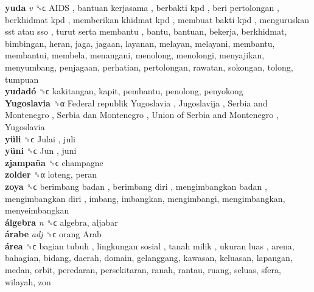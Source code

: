 \textbf{yuda} \emph{v}  ␝ϲ   AIDS ,  bantuan kerjasama ,  berbakti kpd ,  beri pertolongan ,  berkhidmat kpd ,  memberikan khidmat kpd ,  membuat bakti kpd ,  menguruskan sst atau sso ,  turut serta membantu , bantu, bantuan, bekerja, berkhidmat, bimbingan, heran, jaga, jagaan, layanan, melayan, melayani, membantu, membantui, membela, menangani, menolong, menolongi, menyajikan, menyumbang, penjagaan, perhatian, pertolongan, rawatan, sokongan, tolong, tumpuan  \\
\textbf{yudadó} ␝ϲ  kakitangan, kapit, pembantu, penolong, penyokong  \\
\textbf{Yugoslavia} ␝α   Federal republik Yugoslavia ,  Jugoslavija ,  Serbia and Montenegro ,  Serbia dan Montenegro ,  Union of Serbia and Montenegro ,  Yugoslavia   \\
\textbf{yüli} ␝ϲ   Julai , juli  \\
\textbf{yüni} ␝ϲ   Jun , juni  \\
\textbf{zjampaña} ␝ϲ  champagne  \\
\textbf{zolder} ␝α  loteng, peran  \\
\textbf{zoya} ␝ϲ   berimbang badan ,  berimbang diri ,  mengimbangkan badan ,  mengimbangkan diri , imbang, imbangkan, mengimbangi, mengimbangkan, menyeimbangkan  \\
\textbf{álgebra} \emph{n}  ␝ϲ  algebra, aljabar  \\
\textbf{árabe} \emph{adj}  ␝ϲ   orang Arab   \\
\textbf{área} ␝ϲ   bagian tubuh ,  lingkungan sosial ,  tanah milik ,  ukuran luas , arena, bahagian, bidang, daerah, domain, gelanggang, kawasan, keluasan, lapangan, medan, orbit, peredaran, persekitaran, ranah, rantau, ruang, seluas, sfera, wilayah, zon  \\
